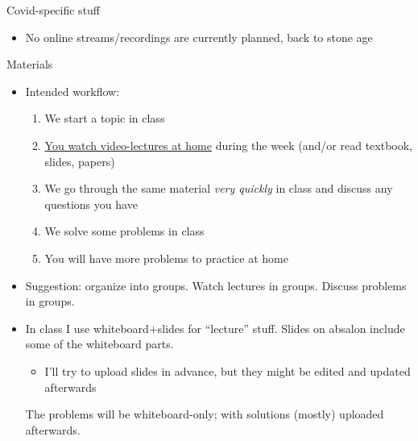 \documentclass[english,10pt
,aspectratio=169
]{beamer}
\begin{document}
\begin{frame}{Covid-specific stuff}
	\begin{itemize}
		\item No online streams/recordings are currently planned, back to stone age
	\end{itemize}
\end{frame}


\begin{frame}{Materials}
	\begin{itemize}
		\item Intended workflow: 
		\begin{enumerate}
			\item We start a topic in class
			\item \uline{You watch video-lectures at home} during the week (and/or read textbook, slides, papers)
			\item We go through the same material \emph{very quickly} in class and discuss any questions you have
			\item We solve some problems in class
			\item You will have more problems to practice at home
		\end{enumerate}
		\pause
		\item Suggestion: organize into groups. Watch lectures in groups. Discuss problems in groups.
		\pause
		\item In class I use whiteboard+slides for ``lecture'' stuff. Slides on absalon include some of the whiteboard parts.
		\begin{itemize}
			\item I'll try to upload slides in advance, but they might be edited and updated afterwards
		\end{itemize}
		The problems will be whiteboard-only; with solutions (mostly) uploaded afterwards.
	\end{itemize}
\end{frame}
\end{document}
